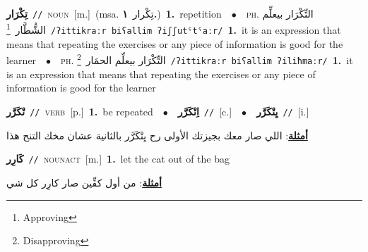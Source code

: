 \documentclass[10pt,a4paper,twoside]{article} %
\begin{document}
\begin{multicols}{2}
{\setlength\topsep{0pt}\textbf{\foreignlanguage{arabic}{تِكْرَار}}\ {\color{gray}\texttt{//}\color{black}}\ \textsc{noun}\ [m.]\ \color{gray}(msa. \foreignlanguage{arabic}{تِكْرار}~\foreignlanguage{arabic}{\textbf{١.}})\color{black}\ \textbf{1.}~repetition\ \ $\bullet$\ \ \textsc{ph.} \color{gray} \foreignlanguage{arabic}{التِّكْرَار بيعلِّم الشُّطَّار}\color{black}\ \footnote{Approving}\ {\color{gray}\texttt{/{\sffamily ʔittikraːr biʕallim ʔiʃʃutˤtˤaːr}/}\color{black}}\ \textbf{1.}~it is an expression that means that repeating the exercises or any piece of information is good for the learner\ \ $\bullet$\ \ \textsc{ph.} \color{gray} \foreignlanguage{arabic}{التِّكْرَار بيعلِّم الحمَار}\color{black}\ \footnote{Disapproving}\ {\color{gray}\texttt{/{\sffamily ʔittikraːr biʕallim ʔiliħmaːr}/}\color{black}}\ \textbf{1.}~it is an expression that means that repeating the exercises or any piece of information is good for the learner\ } \vspace{2mm}

{\setlength\topsep{0pt}\textbf{\foreignlanguage{arabic}{تْكَرَّر}}\ {\color{gray}\texttt{//}\color{black}}\ \textsc{verb}\ [p.]\ \textbf{1.}~be repeated\ \ $\bullet$\ \ \setlength\topsep{0pt}\textbf{\foreignlanguage{arabic}{اِتْكَرَّر}}\ {\color{gray}\texttt{//}\color{black}}\ [c.]\ \ $\bullet$\ \ \setlength\topsep{0pt}\textbf{\foreignlanguage{arabic}{يِتْكَرَّر}}\ {\color{gray}\texttt{//}\color{black}}\ [i.]\  \begin{flushright}\color{gray}\foreignlanguage{arabic}{\textbf{\underline{\foreignlanguage{arabic}{أمثلة}}}: اللي صار معك بجيزتك الأولى رح يِتْكَرَّر بالثانية عشان مخك التنح هذا}\end{flushright}\color{black}} \vspace{2mm}

{\setlength\topsep{0pt}\textbf{\foreignlanguage{arabic}{كَارِر}}\ {\color{gray}\texttt{//}\color{black}}\ \textsc{noun\textunderscore act}\ [m.]\ \textbf{1.}~let the cat out of the bag\  \begin{flushright}\color{gray}\foreignlanguage{arabic}{\textbf{\underline{\foreignlanguage{arabic}{أمثلة}}}: من أول كفِّين صار كارِر كل شي}\end{flushright}\color{black}} \vspace{2mm}


\end{multicols}
\end{document}

